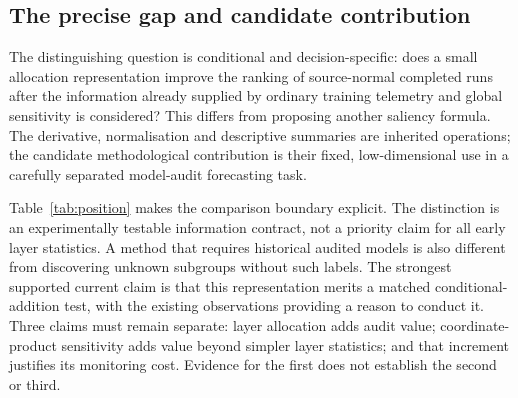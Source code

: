 \documentclass[nolineno]{ieeeaccess}
\begin{document}
\subsection{The precise gap and candidate contribution}
The distinguishing question is conditional and decision-specific: does a small allocation representation improve the ranking of source-normal completed runs after the information already supplied by ordinary training telemetry and global sensitivity is considered? This differs from proposing another saliency formula. The derivative, normalisation and descriptive summaries are inherited operations; the candidate methodological contribution is their fixed, low-dimensional use in a carefully separated model-audit forecasting task.

Table~\ref{tab:position} makes the comparison boundary explicit. The distinction is an experimentally testable information contract, not a priority claim for all early layer statistics. A method that requires historical audited models is also different from discovering unknown subgroups without such labels. The strongest supported current claim is that this representation merits a matched conditional-addition test, with the existing observations providing a reason to conduct it. Three claims must remain separate: layer allocation adds audit value; coordinate-product sensitivity adds value beyond simpler layer statistics; and that increment justifies its monitoring cost. Evidence for the first does not establish the second or third.
\end{document}
